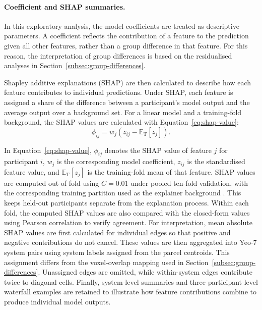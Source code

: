 \paragraph{\textbf{Coefficient and SHAP summaries.}}
\label{par:coefficient-shap}
In this exploratory analysis, the model coefficients are treated as descriptive parameters.
A coefficient reflects the contribution of a feature to the prediction given all other
features, rather than a group difference in that feature. For this reason, the
interpretation of group differences is based on the residualised analyses in
Section~\ref{subsec:group-differences}.

Shapley additive explanations (SHAP) are then calculated to describe how each feature
contributes to individual predictions. Under SHAP, each feature is assigned a share of the
difference between a participant's model output and the average output over a background
set. For a linear model and a training-fold background, the SHAP values are calculated with
Equation~\eqref{eq:shap-value}:
\begin{equation}
\phi_{ij}
=
w_j
\left(
z_{ij}
-
\mathbb{E}_{\mathrm{T}}[z_j]
\right).
\label{eq:shap-value}
\end{equation}

In Equation~\eqref{eq:shap-value}, $\phi_{ij}$ denotes the SHAP value of feature $j$ for participant $i$, $w_j$ is the corresponding model coefficient, $z_{ij}$ is the standardised feature value, and $\mathbb{E}_{\mathrm{T}}[z_j]$ is the training-fold mean of that feature. SHAP values are computed out of fold using $C=0.01$ under pooled ten-fold validation, with the corresponding training partition used as the explainer background \citep{LundbergLee2017}. This keeps held-out participants separate from the explanation process. Within each fold, the computed SHAP values are also compared with the closed-form values using Pearson correlation to verify agreement. For interpretation, mean absolute SHAP values are first calculated for individual edges so that positive and negative contributions do not cancel. These values are then aggregated into Yeo-7 system pairs using system labels assigned from the parcel centroids. This assignment differs from the voxel-overlap mapping used in Section~\ref{subsec:group-differences}. Unassigned edges are omitted, while within-system edges contribute twice to diagonal cells. Finally, system-level summaries and three participant-level waterfall examples are retained to illustrate how feature contributions combine to produce individual model outputs.


